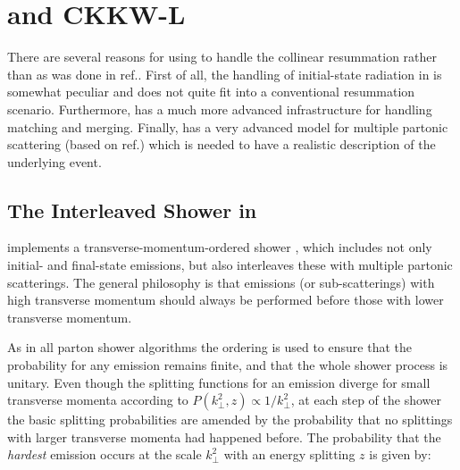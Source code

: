 \section{\protect \py and CKKW-L}
\label{sec:pythia}

There are several reasons for using \py to handle the collinear
resummation rather than \ariadne as was done in
ref.\@  \cite{Andersen:2011zd}. First of all, the handling of initial-state
radiation in \ariadne is somewhat peculiar \cite{Andersson:1988gp} and
does not quite fit into a conventional resummation
scenario. Furthermore, \py has a much more advanced infrastructure for
handling matching and merging. Finally, \py has a very advanced model
for multiple partonic scattering (based on ref.\@  \cite{Sjostrand:1987su}) which is
needed to have a realistic description of the underlying event.

\subsection{The Interleaved Shower in \py}
\label{sec:interl-show-py}

\py implements a transverse-momentum-ordered shower
\cite{Sjostrand:2004ef}, which includes not only initial- 
and
final-state emissions, but also interleaves these with multiple
partonic scatterings. The general philosophy is that emissions (or
sub-scatterings) with high transverse momentum should always be
performed before those with lower transverse momentum.

As in all parton shower algorithms the ordering is used to ensure that
the probability for any emission remains finite, and that the whole
shower process is unitary. Even though the splitting functions for an
emission diverge for small transverse momenta according to
$P(k_\perp^2,z)\propto1/k_\perp^2$, at each step of the shower the
basic splitting probabilities are amended by the probability that no
splittings with larger transverse momenta had happened before.
The probability that the \emph{hardest} emission occurs at the scale 
$k_\perp^2$ with an energy splitting $z$ is given by:

